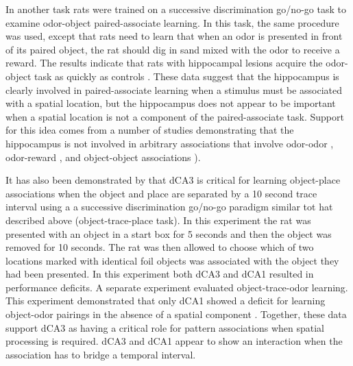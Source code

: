 \documentclass[doc, longtable]{apa6}
\begin{document}
In another task rats were trained on a successive discrimination go/no-go task to examine odor-object paired-associate learning. In this task, the same procedure was used, except that rats need to learn that when an odor is presented in front of its paired object, the rat should dig in sand mixed with the odor to receive a reward. The results indicate that rats with hippocampal lesions acquire the odor-object task as quickly as controls \parencite{Gilbert2002a}. These data suggest that the hippocampus is clearly involved in paired-associate learning when a stimulus must be associated with a spatial location, but the hippocampus does not appear to be important when a spatial location is not a component of the paired-associate task. Support for this idea comes from a number of studies demonstrating that the hippocampus is not involved in arbitrary associations that involve odor-odor \parencite{Bunsey1993a, Li1999a}, odor-reward \parencite{Wood2004a}, and object-object associations \parencite{Cho1995b, Cho1995c, Murray1993a}).

It has also been demonstrated by \textcite{hunsaker2006role} that dCA3 is critical for learning object-place associations when the object and place are separated by a 10 second trace interval using a a successive discrimination go/no-go paradigm similar tot hat described above (object-trace-place task). In this experiment the rat was presented with an object in a start box for 5 seconds and then the object was removed for 10 seconds. The rat was then allowed to choose which of two locations marked with identical foil objects was associated with the object they had been presented. In this experiment both  dCA3 and dCA1 resulted in performance deficits. A separate experiment evaluated object-trace-odor learning. This experiment demonstrated that only dCA1 showed a deficit for learning object-odor pairings in the absence of a spatial component \parencite{kesner2005role}. Together, these data support dCA3 as having a critical role for pattern associations when spatial processing is required. dCA3 and dCA1 appear to show an interaction when the association has to bridge a temporal interval. 
\end{document}
